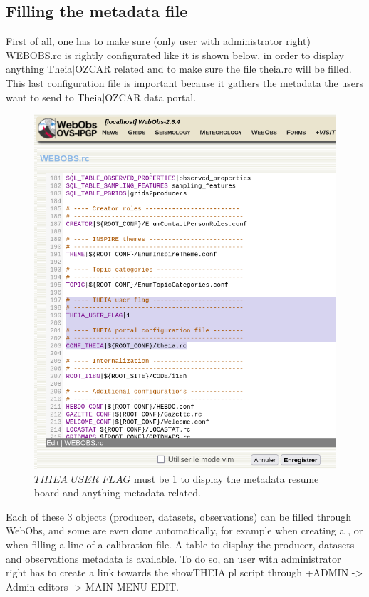 \subsection{Filling the metadata file}

First of all, one has to make sure (only user with administrator right) WEBOBS.rc is rightly configurated like it is shown below, in order to display anything Theia$\vert$OZCAR related and to make sure the file theia.rc will be filled. This last configuration file is important because it gathers the metadata the users want to send to Theia$\vert$OZCAR data portal.

\begin{figure}[!h]
	\centering
	\includegraphics[width=\textwidth]{figures/webobs.rc.png}
	\caption{$THIEA\_USER\_FLAG$ must be 1 to display the metadata resume board and anything metadata related.}
	\label{webobs.rc}
\end{figure}

Each of these 3 objects (producer, datasets, observations) can be filled through WebObs, and some are even done automatically, for example when creating a , or when filling a line of a calibration file. A table to display the producer, datasets and observations metadata is available. To do so, an user with administrator right has to create a link towards the showTHEIA.pl script through +ADMIN -> Admin editors -> MAIN MENU EDIT. 

